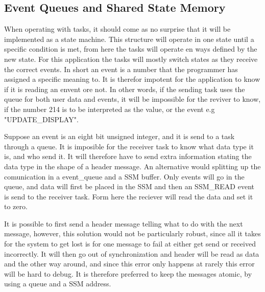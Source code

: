 \subsection{Event Queues and Shared State Memory}
\label{sec:EventQueuesandSharedStateMemory}

When operating with tasks, it should come as no surprise that it will be implemented as a state machine. This structure will operate in one state until a specific condition is met, from here the tasks will operate en ways defined by the new state. For this application the tasks will mostly switch states as they receive the correct events. In short an event is a number that the programmer has assigned a specific meaning to. It is therefor impotent for the application to know if it is reading an envent ore not.  In other words, if the sending task uses the queue for both user data and events, it will be impossible for the reviver to know, if the number 214 is to be interpreted as the value, or the event e.g "UPDATE\_DISPLAY". 


Suppose an event is an eight bit unsigned integer, and it is send to a task through a queue. It is imposible for the receiver task to know what data type it is, and who send it. It will therefore have to send extra information stating the data type in the shape of a header message. 
An alternative would splitting up the comunication in a event\_queue and a SSM buffer. Only events will go in the queue, and data will first be placed in the SSM and then an SSM\_READ event is send to the receiver task. Form here the reciever will read the data and set it to zero. 

It is possible to first send a header message telling what to do with the next message, however, this solution would not be particularly robust, since all it takes for the system to get lost is for one message to fail at either get send or received incorrectly. It will then go out of synchronization and header will be read as data and the other way around, and since this error only happens at rarely this error will be hard to debug. It is therefore preferred to keep the messages atomic, by using a queue and a SSM address. 
 








